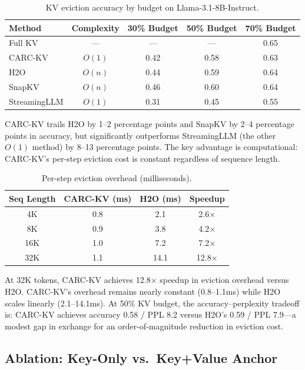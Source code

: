 \documentclass[11pt]{article}
\begin{document}
\begin{table}[h]
\centering
\caption{KV eviction accuracy by budget on Llama-3.1-8B-Instruct.}
\label{tab:kveviction}
\small
\begin{tabular}{@{}lcccc@{}}
\toprule
Method & Complexity & 30\% Budget & 50\% Budget & 70\% Budget \\
\midrule
Full KV & --- & --- & --- & 0.65 \\
CARC-KV & $O(1)$ & 0.42 & 0.58 & 0.63 \\
H2O & $O(n)$ & 0.44 & 0.59 & 0.64 \\
SnapKV & $O(n)$ & 0.46 & 0.60 & 0.64 \\
StreamingLLM & $O(1)$ & 0.31 & 0.45 & 0.55 \\
\bottomrule
\end{tabular}
\end{table}

CARC-KV trails H2O by 1--2 percentage points and SnapKV by 2--4 percentage points in accuracy, but significantly outperforms StreamingLLM (the other $O(1)$ method) by 8--13 percentage points. The key advantage is computational: CARC-KV's per-step eviction cost is constant regardless of sequence length.

\begin{table}[h]
\centering
\caption{Per-step eviction overhead (milliseconds).}
\label{tab:wallclock}
\small
\begin{tabular}{@{}cccc@{}}
\toprule
Seq Length & CARC-KV (ms) & H2O (ms) & Speedup \\
\midrule
4K & 0.8 & 2.1 & 2.6$\times$ \\
8K & 0.9 & 3.8 & 4.2$\times$ \\
16K & 1.0 & 7.2 & 7.2$\times$ \\
32K & 1.1 & 14.1 & 12.8$\times$ \\
\bottomrule
\end{tabular}
\end{table}

At 32K tokens, CARC-KV achieves 12.8$\times$ speedup in eviction overhead versus H2O. CARC-KV's overhead remains nearly constant (0.8--1.1ms) while H2O scales linearly (2.1--14.1ms). At 50\% KV budget, the accuracy--perplexity tradeoff is: CARC-KV achieves accuracy 0.58 / PPL 8.2 versus H2O's 0.59 / PPL 7.9---a modest gap in exchange for an order-of-magnitude reduction in eviction cost.

\subsection{Ablation: Key-Only vs.\ Key+Value Anchor}
\end{document}
